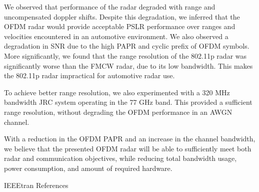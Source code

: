 \documentclass[conference]{IEEEtran}
\begin{document}
We observed that performance of the radar degraded with range and uncompensated doppler shifts. Despite this degradation, we inferred that the OFDM radar would provide acceptable PSLR performance over ranges and velocities encountered in an automotive environment. We also observed a degradation in SNR due to the high PAPR and cyclic prefix of OFDM symbols. More significantly, we found that the range resolution of the 802.11p radar was significantly worse than the FMCW radar, due to its low bandwidth. This makes the 802.11p radar impractical for automotive radar use.

To achieve better range resolution, we also experimented with a 320 MHz bandwidth JRC system operating in the 77 GHz band. This provided a sufficient range resolution, without degrading the OFDM performance in an AWGN channel.

With a reduction in the OFDM PAPR and an increase in the channel bandwidth, we believe that the presented OFDM radar will be able to sufficiently meet both radar and communication objectives, while reducing total bandwidth usage, power consumption, and amount of required hardware.


	 {IEEEtran}
	 {References}
	
  
\end{document}
